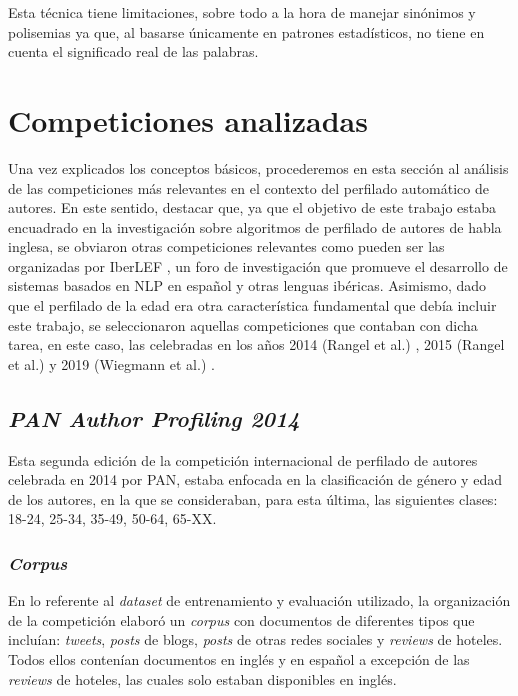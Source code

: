 \bigskip
Esta técnica tiene limitaciones, sobre todo a la hora de manejar sinónimos y polisemias ya que, al basarse únicamente en patrones estadísticos,
no tiene en cuenta el significado real de las palabras.

\section{Competiciones analizadas}
\label{sec:competiciones_analizados}

Una vez explicados los conceptos básicos, procederemos en esta sección al análisis de las competiciones más relevantes en el contexto
del perfilado automático de autores. En este sentido, destacar que, ya que el objetivo de este trabajo estaba encuadrado en
la investigación sobre algoritmos de perfilado de autores de habla inglesa, se obviaron otras competiciones relevantes como pueden ser
las organizadas por IberLEF \cite{iberlef}, un foro de investigación que promueve el desarrollo de sistemas basados en NLP en español y otras
lenguas ibéricas.
Asimismo, dado que el perfilado de la edad era otra característica fundamental que debía incluir este trabajo, se seleccionaron aquellas competiciones
que contaban con dicha tarea, en este caso, las celebradas en los años 2014 (Rangel et al.) \cite{rangel2014overview}, 2015 (Rangel et al.) \cite{rangel2015overview} y 2019 (Wiegmann et al.) \cite{wiegmann2019overview}.

\subsection{\textit{PAN Author Profiling 2014}}

Esta segunda edición de la competición internacional de perfilado de autores celebrada en 2014 por PAN, estaba enfocada en la clasificación de género y edad de los autores, en la que se consideraban, para esta última, las siguientes
clases: 18-24, 25-34, 35-49, 50-64, 65-XX.

\subsubsection{\textit{Corpus}}

En lo referente al \textit{dataset} de entrenamiento y evaluación utilizado, la organización de la
competición elaboró un \textit{corpus} con documentos de diferentes tipos que incluían: \textit{tweets}, \textit{posts} de blogs, \textit{posts} de otras redes sociales y \textit{reviews} de hoteles.
Todos ellos contenían documentos en inglés y en español a excepción de las \textit{reviews} de hoteles, las cuales solo estaban disponibles en inglés.

